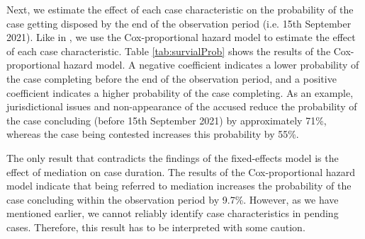Next, we estimate the effect of each case characteristic on the probability of the case getting disposed by the end of the observation period (i.e. 15th September 2021). Like in \textcite{datta2017_itatDelays}, we use the Cox-proportional hazard model to estimate the effect of each case characteristic. Table \ref{tab:survialProb} shows the results of the Cox-proportional hazard model. A negative coefficient indicates a lower probability of the case completing before the end of the observation period, and a positive coefficient indicates a higher probability of the case completing. As an example, jurisdictional issues and non-appearance of the accused reduce the probability of the case concluding (before 15th September 2021) by approximately 71\%, whereas the case being contested increases this probability by 55\%.

The only result that contradicts the findings of the fixed-effects model is the effect of mediation on case duration. The results of the Cox-proportional hazard model indicate that being referred to mediation increases the probability of the case concluding within the observation period by 9.7\%. However, as we have mentioned earlier, we cannot reliably identify case characteristics in pending cases. Therefore, this result has to be interpreted with some caution.

